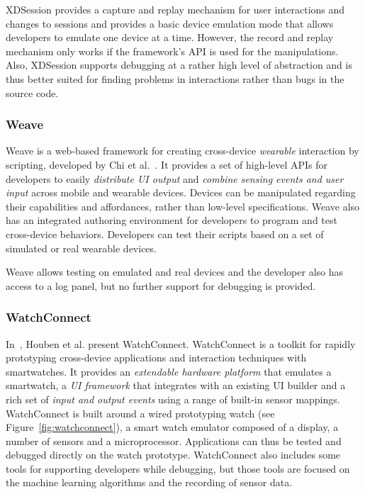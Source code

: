 XDSession provides a capture and replay mechanism for user interactions and changes to sessions and provides a basic device emulation mode that allows developers to emulate one device at a time. However, the record and replay mechanism only works if the framework's API is used for the manipulations. Also, XDSession supports debugging at a rather high level of abstraction and is thus better suited for finding problems in interactions rather than bugs in the source code.

\subsubsection{Weave}

Weave is a web-based framework for creating cross-device \emph{wearable} interaction by scripting, developed by Chi et al.~\cite{weave2015}. It provides a set of high-level APIs for developers to easily \emph{distribute UI output} and \emph{combine sensing events and user input} across mobile and wearable devices. Devices can be manipulated regarding their capabilities and affordances, rather than low-level specifications. Weave also has an integrated authoring environment for developers to program and test cross-device behaviors. Developers can test their scripts based on a set of simulated or real wearable devices.

Weave allows testing on emulated and real devices and the developer also has access to a log panel, but no further support for debugging is provided. 

\subsubsection{WatchConnect}

In~\cite{watchconnect2015}, Houben et al. present WatchConnect. WatchConnect is a toolkit for rapidly prototyping cross-device applications and interaction techniques with smartwatches. It provides an \emph{extendable hardware platform} that emulates a smartwatch, a \emph{UI framework} that integrates with an existing UI builder and a rich set of \emph{input and output events} using a range of built-in sensor mappings. WatchConnect is built around a wired prototyping watch (see Figure~\ref{fig:watchconnect}), a smart watch emulator composed of a display, a number of sensors and a microprocessor. Applications can thus be tested and debugged directly on the watch prototype. WatchConnect also includes some tools for supporting developers while debugging, but those tools are focused on the machine learning algorithms and the recording of sensor data.

